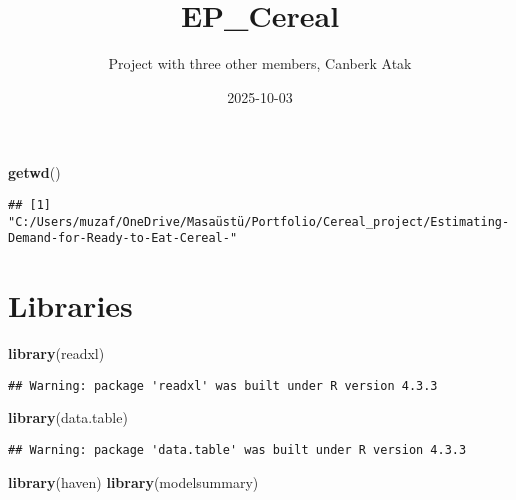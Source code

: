 \documentclass[
]{article}
\title{EP\_Cereal}
\author{Project with three other members, Canberk Atak}
\date{2025-10-03}
\newenvironment{Shaded}{\begin{snugshade}}{\end{snugshade}}
\newcommand{\AttributeTok}[1]{\textcolor[rgb]{0.13,0.29,0.53}{#1}}
\newcommand{\ConstantTok}[1]{\textcolor[rgb]{0.56,0.35,0.01}{#1}}
\newcommand{\FunctionTok}[1]{\textcolor[rgb]{0.13,0.29,0.53}{\textbf{#1}}}
\newcommand{\NormalTok}[1]{#1}
\newcommand{\SpecialCharTok}[1]{\textcolor[rgb]{0.81,0.36,0.00}{\textbf{#1}}}
\begin{document}
\maketitle

\begin{Shaded}
\begin{Highlighting}[]
\FunctionTok{getwd}\NormalTok{()}
\end{Highlighting}
\end{Shaded}

\begin{verbatim}
## [1] "C:/Users/muzaf/OneDrive/Masaüstü/Portfolio/Cereal_project/Estimating-Demand-for-Ready-to-Eat-Cereal-"
\end{verbatim}

\begin{Shaded}
\end{Shaded}

\section{Libraries}\label{libraries}

\begin{Shaded}
\begin{Highlighting}[]
\FunctionTok{library}\NormalTok{(readxl)}
\end{Highlighting}
\end{Shaded}

\begin{verbatim}
## Warning: package 'readxl' was built under R version 4.3.3
\end{verbatim}

\begin{Shaded}
\begin{Highlighting}[]
\FunctionTok{library}\NormalTok{(data.table)}
\end{Highlighting}
\end{Shaded}

\begin{verbatim}
## Warning: package 'data.table' was built under R version 4.3.3
\end{verbatim}

\begin{Shaded}
\begin{Highlighting}[]
\FunctionTok{library}\NormalTok{(haven)}
\FunctionTok{library}\NormalTok{(modelsummary)}
\end{Highlighting}
\end{Shaded}
\end{document}

